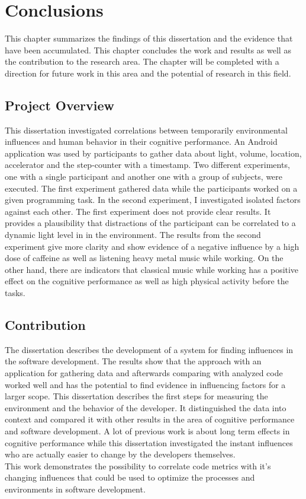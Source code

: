 \chapter{Conclusions}
This chapter summarizes the findings of this dissertation and the evidence that have been accumulated. This chapter concludes the work and results as well as the contribution to the research area. 
The chapter will be completed with a direction for future work in this area and the potential of research in this field. 

\section{Project Overview}
This dissertation investigated correlations between temporarily environmental influences and human behavior in their cognitive performance. 
An Android application was used by participants to gather data about light, volume, location, accelerator and the step-counter with a timestamp.  
Two different experiments, one with a single participant and another one with a group of subjects, were executed. The first experiment gathered data while the participants worked on a given programming task. In the second experiment, I investigated isolated factors against each other.
The first experiment does not provide clear results. It provides a plausibility that distractions of the participant can be correlated to a dynamic light level in in the environment. 
The results from the second experiment give more clarity and show evidence of a negative influence by a high dose of caffeine as well as listening heavy metal music while working. On the other hand, there are indicators that classical music while working has a positive effect on the cognitive performance  as well as high physical activity before the tasks. 

\section{Contribution}
The dissertation describes the development of a system for finding influences in the software development. The results show that the approach with an application for gathering data and afterwards comparing with analyzed code worked well and has the potential to find evidence in influencing factors for a larger scope. 
\bigbreak
This dissertation describes the first steps for measuring the environment and the behavior of the developer. It distinguished the data into context and compared it with other results in the area of cognitive performance and software development. A lot of previous work is about long term effects in cognitive performance while this dissertation investigated the instant influences who are actually easier to change by the developers themselves. \\
This work demonstrates the possibility to correlate code metrics with it's changing influences that could be used to optimize the processes and environments in software development. 

